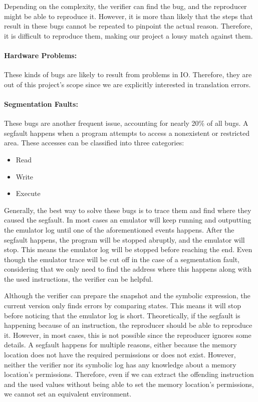 Depending on the complexity, the verifier can find the bug, and the reproducer might be able to reproduce it.
However, it is more than likely that the steps that result in these bugs cannot be repeated to pinpoint the actual reason.
Therefore, it is difficult to reproduce them, making our project a lousy match against them.

\paragraph{Hardware Problems:}
These kinds of bugs are likely to result from problems in IO.
Therefore, they are out of this project's scope since we are explicitly interested in translation errors.


\paragraph{Segmentation Faults:}
These bugs are another frequent issue, accounting for nearly 20\% of all bugs.
A \ac{segfault} happens when a program attempts to access a nonexistent or restricted area.
These accesses can be classified into three categories:
\begin{itemize}
  \item Read
  \item Write
  \item Execute
\end{itemize}
Generally, the best way to solve these bugs is to trace them and find where they caused the \ac{segfault}.
In most cases an emulator will keep running and outputting the emulator log until one of the aforementioned events happens.
After the \ac{segfault} happens, the program will be stopped abruptly, and the emulator will stop.
This means the emulator log will be stopped before reaching the end.
Even though the emulator trace will be cut off in the case of a segmentation fault, considering that we only need to find the address where this happens along with the used instructions, the verifier can be helpful.

Although the verifier can prepare the snapshot and the symbolic expression, the current version only finds errors by comparing states.
This means it will stop before noticing that the emulator log is short.
Theoretically, if the \ac{segfault} is happening because of an instruction, the reproducer should be able to reproduce it. 
However, in most cases, this is not possible since the reproducer ignores some details.
A \ac{segfault} happens for multiple reasons, either because the memory location does not have the required permissions or does not exist.
However, neither the verifier nor its symbolic log has any knowledge about a memory location's permissions.
Therefore, even if we can extract the offending instruction and the used values without being able to set the memory location's permissions, we cannot set an equivalent environment.

